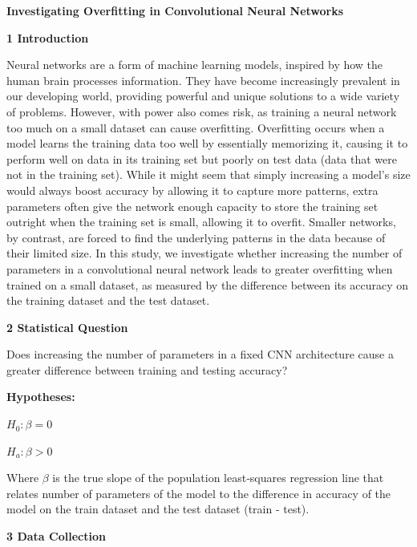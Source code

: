\documentclass[12pt]{article}
\begin{document}
    \centerline{\textbf{Investigating Overfitting in Convolutional Neural Networks}}

    \noindent\textbf{1 Introduction}

    Neural networks are a form of machine learning models, inspired by how the human brain
    processes information. They have become increasingly prevalent in our developing world, providing
    powerful and unique solutions to a wide variety of problems. However, with power also comes risk,
    as training a neural network too much on a small dataset can cause overfitting. Overfitting occurs
    when a model learns the training data too well by essentially memorizing it, causing it to perform
    well on data in its training set but poorly on test data (data that were not in the training set).
    While it might seem that simply increasing a model’s size would always boost accuracy by allowing it to
    capture more patterns, extra parameters often give the network enough capacity to store the training set
    outright when the training set is small, allowing it to overfit. Smaller networks, by contrast, are forced to find the underlying patterns
    in the data because of their limited size. In this study, we investigate whether increasing the number of
    parameters in a convolutional neural network leads to greater overfitting when trained on a small dataset, as
    measured by the difference between its accuracy on the training dataset and the test dataset.

    \noindent\textbf{2 Statistical Question}

    Does increasing the number of parameters in a fixed CNN architecture cause a greater difference
    between training and testing accuracy?

    \noindent\textbf{Hypotheses:}\newline
    \centerline{$H_0: \beta = 0$} \newline
    \centerline{$H_a: \beta > 0$} \newline
    Where $\beta$ is the true slope of the population least‐squares regression line that relates number
    of parameters of the model to the difference in accuracy of the model on the train dataset and the
    test dataset (train - test).

    \noindent\textbf{3 Data Collection}
\end{document}
